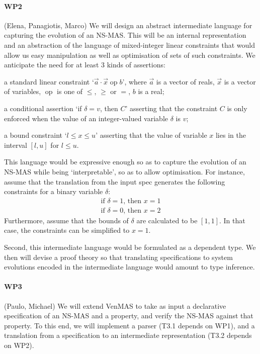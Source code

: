 \documentclass[11pt]{article}
\newcommand{\op}{\mathop{\text{op}}}
\begin{document}
\paragraph{WP2} (Elena, Panagiotis, Marco) We will design an
abstract intermediate language for capturing the evolution of an
NS-MAS. This will be an internal representation and an abstraction of
the language of mixed-integer linear constraints that would allow us
easy manipulation as well as optimisation of sets of such
constraints. We anticipate the need for at least 3 kinds of
assertions:
\begin{inparaenum}[\it (i)]
\item a standard linear constraint `$\vec{a} \cdot \vec{x} \op b$',
  where $\vec{a}$ is a vector of reals, $\vec{x}$ is a vector of
  variables, $\op$ is one of $\leq$, $\geq$ or $=$, $b$ is a real;
\item a conditional assertion `if $\delta = v$, then $C$' asserting
  that the constraint $C$ is only enforced when the value of an
  integer-valued variable $\delta$ is $v$;
\item a bound constraint `$l \leq x \leq u$' asserting that the value
  of variable $x$ lies in the interval $[l,u]$ for $l\leq u$.
\end{inparaenum}
This language would be expressive enough so as to capture the
evolution of an NS-MAS while being `interpretable', so as to allow
optimisation.  For instance, assume that the translation from the
input spec generates the following constraints for a binary variable
$\delta$:
\[
  \begin{array}{l}
    \text{if }\delta = 1\text{, then }x = 1\\
    \text{if }\delta = 0\text{, then }x = 2
  \end{array}
\]
Furthermore, assume that the bounds of $\delta$ are calculated to be
$[1,1]$. In that case, the constraints can be simplified to $x=1$.

Second, this intermediate language would be formulated as a dependent
type. We then will devise a proof theory so that translating
specifications to system evolutions encoded in the intermediate
language would amount to type inference.

\paragraph{WP3} (Paulo, Michael) We will extend VenMAS to take as
input a declarative specification of an NS-MAS and a property, and
verify the NS-MAS against that property. To this end, we will
implement a parser (T3.1 depends on WP1), and a translation from a
specification to an intermediate representation (T3.2 depends on WP2).
\end{document}
